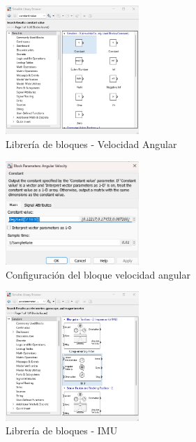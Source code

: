 \begin{figure}[h!]
    \centering
    \includegraphics[width=0.45\textwidth]{fig/Capitulo5/Caso_de_estudio_IMU/Generador_de_archivos/libreria_de_bloques_constante_velocidad_angular.png}
    \caption{Librería de bloques - Velocidad Angular}
    \label{fig:lib_bloques_angular_velocity}
\end{figure}

\begin{figure}[h!]
    \centering
    \includegraphics[width=0.45\textwidth]{fig/Capitulo5/Caso_de_estudio_IMU/Generador_de_archivos/configuracion_bloque_velocidad_angular.png}
    \caption{Configuración del bloque velocidad angular}
    \label{fig:lib_bloques_config_angular_velocity}
\end{figure}

\begin{figure}[h!]
    \centering
    \includegraphics[width=0.45\textwidth]{fig/Capitulo5/Caso_de_estudio_IMU/Generador_de_archivos/libreria_de_bloques_IMU.png}
    \caption{Librería de bloques - IMU}
    \label{fig:lib_bloques_IMU}
\end{figure}


